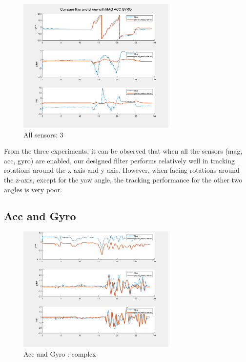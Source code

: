 \begin{figure}[H]
 \centering
 \includegraphics[width=0.7\textwidth]{images/allsensor3.png}
 \caption{All sensors: 3}
 \label{all3}
\end{figure}

From the three experiments, it can be observed that when all the sensors (mag, acc, gyro) are enabled, our designed filter performs relatively well in tracking rotations around the x-axis and y-axis. However, when facing rotations around the z-axis, except for the yaw angle, the tracking performance for the other two angles is very poor.

\subsection{Acc and Gyro}

\begin{figure}[H]
 \centering
 \includegraphics[width=0.7\textwidth]{images/accgyro.png}
 \caption{Acc and Gyro : complex}
 \label{accgyrocomplex}
\end{figure}

